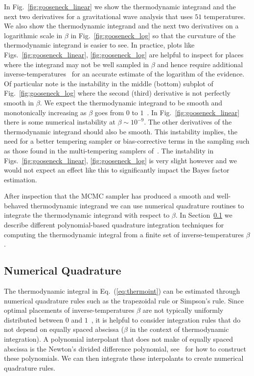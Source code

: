 In Fig.~\ref{fig:gooseneck_linear} we show the thermodynamic integrand and the next two derivatives for a gravitational wave analysis that uses $51$ temperatures. We also show the thermodynamic integrand and the next two derivatives on a logarithmic scale in $\beta$ in Fig.~\ref{fig:gooseneck_log} so that the curvature of the thermodynamic integrand is easier to see. In practice, plots like Figs.~\ref{fig:gooseneck_linear}, \ref{fig:gooseneck_log} are helpful to inspect for places where the integrand may not be well sampled in $\beta$ and hence require additional inverse-temperatures~\cite{liu2016evaluating, de2011free, de2013comparison} for an accurate estimate of the logarithm of the evidence. Of particular note is the instability in the middle (bottom) subplot of Fig.~\ref{fig:gooseneck_log} where the second (third) derivative is not perfectly smooth in $\beta$. We expect the thermodynamic integrand to be smooth and monotonically increasing as $\beta$ goes from $0$ to $1$~\cite{annis2019thermodynamic}. In Fig.~\ref{fig:gooseneck_linear} there is some numerical instability at $\beta \sim 10^{-9}$. The other derivatives of the thermodynamic integrand should also be smooth. This instability implies, the need for a better tempering sampler or bias-corrective terms in the sampling such as those found in the multi-tempering samplers of~\cite{oates2017control,evans2019thermodynamic}. The instability in Figs.~\ref{fig:gooseneck_linear}, \ref{fig:gooseneck_log} is very slight however and we would not expect an effect like this to significantly impact the Bayes factor estimation.

After inspection that the MCMC sampler has produced a smooth and well-behaved thermodynamic integrand we can use numerical quadrature routines to integrate the thermodynamic integrand with respect to $\beta$. In Section~\ref{sec:ti_num_quad} we describe different polynomial-based quadrature integration techniques for computing the thermodynamic integral from a finite set of inverse-temperatures $\beta$.

\subsection{Numerical Quadrature}\label{sec:ti_num_quad}
The thermodynamic integral in Eq.~(\ref{eq:thermoint}) can be estimated through numerical quadrature rules such as the trapezoidal rule or Simpson's rule. Since optimal placements of inverse-temperatures $\beta$ are not typically uniformly distributed between $0$ and $1$~\cite{annis2019thermodynamic}, it is helpful to consider integration rules that do not depend on equally spaced abscissa ($\beta$ in the context of thermodynamic integration). A polynomial interpolant that does not make of equally spaced abscissa is the Newton's divided difference polynomial, see~\cite{brun1953generalization, selmer1958numerical, abramowitz1965handbook} for how to construct these polynomials. We can then integrate these interpolants to create numerical quadrature rules.

